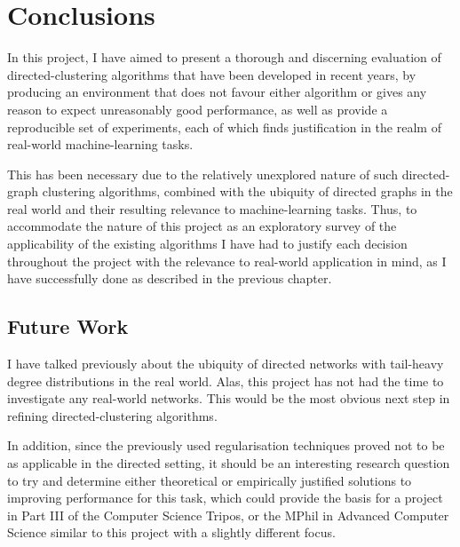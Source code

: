 \chapter{Conclusions}

In this project, I have aimed to present a thorough and discerning evaluation of directed-clustering
algorithms that have been developed in recent years, by producing an environment that does not 
favour either algorithm or gives any reason to expect unreasonably good performance, as well as 
provide a reproducible set of experiments, each of which finds justification in the realm of 
real-world machine-learning tasks.

This has been necessary due to the relatively unexplored nature of such directed-graph clustering 
algorithms, combined with the ubiquity of directed graphs in the real world and their resulting 
relevance to machine-learning tasks. Thus, to accommodate the nature of this project as an 
exploratory survey of the applicability of the existing algorithms I have had to justify each 
decision throughout the project with the relevance to real-world application in mind, as I have 
successfully done as described in the previous chapter.

\section*{Future Work}
I have talked previously about the ubiquity of directed networks with tail-heavy degree 
distributions in the real world. Alas, this project has not had the time to investigate any 
real-world networks. This would be the most obvious next step in refining directed-clustering 
algorithms. 

In addition, since the previously used regularisation techniques proved not to be as applicable in 
the directed setting, it should be an interesting research question  to try and determine either 
theoretical or empirically justified solutions to improving performance for this task, which could 
provide the basis for a project in Part III of the Computer Science Tripos, or the MPhil in 
Advanced Computer Science similar to this project with a slightly different focus.


